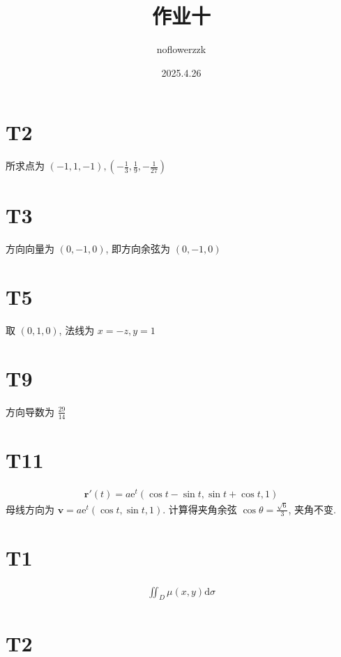 \documentclass{article}
\title{作业十}
\author{noflowerzzk}
\date{2025.4.26}
\newcommand{\dd}{\mathrm{d}}
\begin{document}
\maketitle

\section*{T2}

所求点为 $(-1, 1, -1), \left(-\frac{1}{3}, \frac{1}{9}, -\frac{1}{27}\right)$

\section*{T3}

方向向量为 $(0, -1, 0)$, 即方向余弦为 $(0, -1, 0)$

\section*{T5}

取 $(0, 1, 0)$, 法线为 $x = -z, y = 1$

\section*{T9}

方向导数为 $\frac{29}{14}$

\section*{T11}

\begin{align*}
    \boldsymbol{r}'(t) = a\mathrm{e}^t(\cos t - \sin t, \sin t + \cos t, 1)
\end{align*}
母线方向为 $\boldsymbol{v} = a\mathrm{e}^t(\cos t, \sin t, 1)$.
计算得夹角余弦 $\cos \theta = \frac{\sqrt{6}}{3}$, 夹角不变.

\section*{T1}

\begin{align*}
    \iint_D \mu (x, y) \dd \sigma
\end{align*}

\section*{T2}
\end{document}
